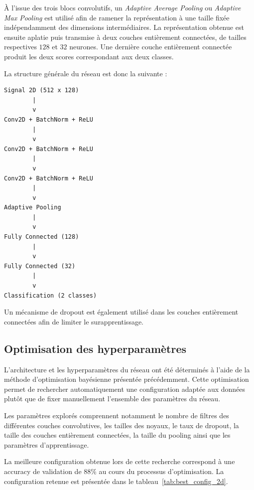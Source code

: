 \documentclass[12pt,a4paper,twoside]{article}
\begin{document}
À l'issue des trois blocs convolutifs, un \textit{Adaptive Average Pooling} ou \textit{Adaptive Max Pooling} est utilisé afin de ramener la représentation à une taille fixée indépendamment des dimensions intermédiaires. La représentation obtenue est ensuite aplatie puis transmise à deux couches entièrement connectées, de tailles respectives $128$ et $32$ neurones. Une dernière couche entièrement connectée produit les deux scores correspondant aux deux classes.

La structure générale du réseau est donc la suivante :

\begin{center}
\begin{verbatim}
Signal 2D (512 x 128)
        |
        v
Conv2D + BatchNorm + ReLU
        |
        v
Conv2D + BatchNorm + ReLU
        |
        v
Conv2D + BatchNorm + ReLU
        |
        v
Adaptive Pooling
        |
        v
Fully Connected (128)
        |
        v
Fully Connected (32)
        |
        v
Classification (2 classes)
\end{verbatim}
\end{center}

Un mécanisme de dropout est également utilisé dans les couches entièrement connectées afin de limiter le surapprentissage.

\subsection{Optimisation des hyperparamètres}
\label{subsec:optimisation_2d}

L'architecture et les hyperparamètres du réseau ont été déterminés à l'aide de la méthode d'optimisation bayésienne présentée précédemment. Cette optimisation permet de rechercher automatiquement une configuration adaptée aux données plutôt que de fixer manuellement l'ensemble des paramètres du réseau.

Les paramètres explorés comprennent notamment le nombre de filtres des différentes couches convolutives, les tailles des noyaux, le taux de dropout, la taille des couches entièrement connectées, la taille du pooling ainsi que les paramètres d'apprentissage.

La meilleure configuration obtenue lors de cette recherche correspond à une accuracy de validation de $88\%$ au cours du processus d'optimisation. La configuration retenue est présentée dans le tableau~\ref{tab:best_config_2d}.
\end{document}
